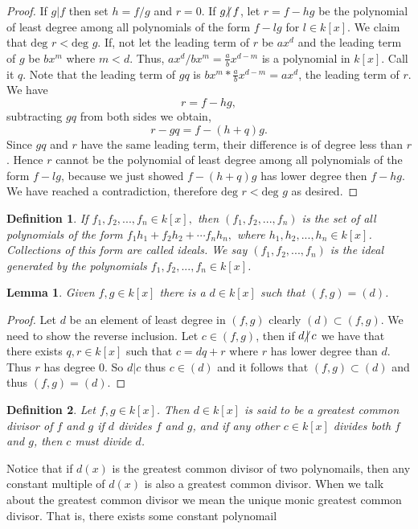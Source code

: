 \documentclass{article}
\theoremstyle{problemstyle}
\newtheorem{lemma}{Lemma}
\newtheorem{definition}{Definition}
\newcommand{\ndiv}{\hspace{-4pt}\not|\hspace{2pt}}
\begin{document}
\begin{proof}
If $g|f$ then set $h = f/g$ and $r = 0$. If $g \ndiv f$, let $r = f-hg$ be the polynomial of least degree among all polynomials of the form $f-lg$ for $l \in k[x]$. We claim that $\text{deg }r < \text{deg }g$. If, not let the leading term of $r$ be $ax^d$ and the leading term of $g$ be $bx^m$ where $m < d$. Thus, $ax^d/bx^m = \frac{a}{b}x^{d-m}$ is a polynomial in $k[x]$.  Call it $q$. Note that the leading term of $gq$ is $bx^m * \frac{a}{b}x^{d-m} = ax^d$, the leading term of $r$. We have $$r = f-hg,$$ subtracting $gq$ from both sides we obtain, $$r-gq = f-(h+q)g.$$ Since $gq$ and $r$ have the same leading term, their difference is of degree less than $r$. Hence $r$ cannot be the polynomial of least degree among all polynomials of the form $f-lg$, because we just showed $f-(h+q)g$ has lower degree then $f-hg$. We have reached a contradiction, therefore $\text{deg }r < \text{deg }g$ as desired. 
\end{proof}

\begin{definition}
If $f_1,f_2,...,f_n \in k[x],$ then $(f_1,f_2,...,f_n)$ is the set of all polynomials of the form $f_1h_1+f_2h_2+\cdots f_nh_n,$ where $h_1,h_2,...,h_n \in k[x]$. Collections of this form are called ideals. We say $(f_1,f_2,...,f_n)$ is the ideal generated by the polynomials $f_1,f_2,...,f_n \in k[x]$. 
\end{definition}

\begin{lemma}
Given $f,g \in k[x]$ there is a $d \in k[x]$ such that $(f,g) = (d)$. 
\end{lemma}

\begin{proof}
Let $d$ be an element of least degree in $(f,g)$ clearly $(d) \subset (f,g)$. We need to show the reverse inclusion. Let $c \in (f,g)$, then if $d \ndiv c$ we have that there exists $q,r \in k[x]$ such that $c = dq + r$ where $r$ has lower degree than $d$. Thus $r$ has degree $0$. So $d|c$ thus $c \in (d)$ and it follows that $(f,g) \subset (d)$ and thus $(f,g) = (d)$. 
\end{proof}

\begin{definition}
Let $f,g \in k[x]$. Then $d \in k[x]$ is said to be a greatest common divisor of $f$ and $g$ if $d$ divides $f$ and $g$, and if any other $c \in k[x]$ divides both $f$ and $g$, then $c$ must divide $d$.  
\end{definition}

Notice that if $d(x)$ is the greatest common divisor of two polynomails, then any constant multiple of $d(x)$ is also a greatest common divisor. When we talk about the greatest common divisor we mean the unique monic greatest common divisor. That is, there exists some constant polynomail    
\end{document}
